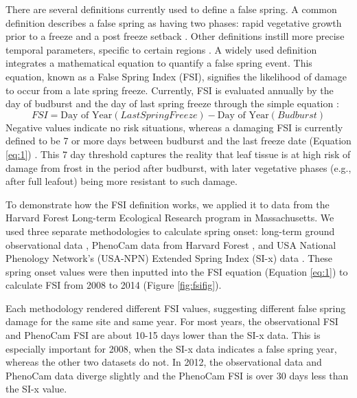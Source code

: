\documentclass{article}\usepackage[]{graphicx}\usepackage[]{color}
\begin{document}
There are several definitions currently used to define a false spring. A common definition describes a false spring as having two phases: rapid vegetative growth prior to a freeze and a post freeze setback \citep{Gu2008}. Other definitions instill more precise temporal parameters, specific to certain regions \citep[e.g., in][false spring for the Midwestern United States is defined as a warmer than average March, a freezing April, and enough growing degree days between budburst and the last freeze date]{Augspurger2013}. A widely used definition integrates a mathematical equation to quantify a false spring event. This equation, known as a False Spring Index (FSI), signifies the likelihood of damage to occur from a late spring freeze. Currently, FSI is evaluated annually by the day of budburst and the day of last spring freeze \citep[often calculated at -2.2$^{\circ}$C,][]{Schwartz1993} through the simple equation \citep{Marino2011}:
\begin{equation} \label{eq:1}
FSI = \text{Day of Year} (Last Spring Freeze) - \text{Day of Year} (Budburst)
\end{equation}
Negative values indicate no risk situations, whereas a damaging FSI is currently defined to be 7 or more days between budburst and the last freeze date (Equation \ref{eq:1}) \citep{Peterson2014}. This 7 day threshold captures the reality that leaf tissue is at high risk of damage from frost in the period after budburst, with later vegetative phases (e.g., after full leafout) being more resistant to such damage.%

To demonstrate how the FSI definition works, we applied it to data from the Harvard Forest Long-term Ecological Research program in Massachusetts. We used three separate methodologies to calculate spring onset: long-term ground observational data \citep{Okeefe2014}, PhenoCam data from Harvard Forest \citep{Richardson2015}, and USA National Phenology Network's (USA-NPN) Extended Spring Index (SI-x) data \citep{USA-NPN2016}. These spring onset values were then inputted into the FSI equation (Equation \ref{eq:1}) to calculate FSI from 2008 to 2014 (Figure \ref{fig:fsifig}). 

Each methodology rendered different FSI values, suggesting different false spring damage for the same site and same year. For most years, the observational FSI and PhenoCam FSI are about 10-15 days lower than the SI-x data. This is especially important for 2008, when the SI-x data indicates a false spring year, whereas the other two datasets do not. In 2012, the observational data and PhenoCam data diverge slightly and the PhenoCam FSI is over 30 days less than the SI-x value.
\end{document}
